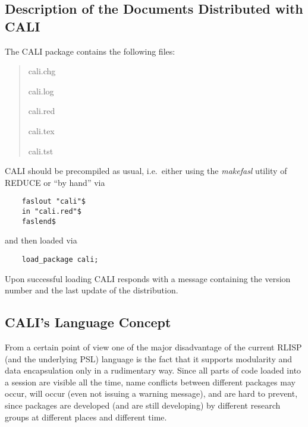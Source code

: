 \subsection{Description of the Documents Distributed with CALI}

The CALI package contains the following files:
\begin{quote}
cali.chg


cali.log


cali.red


cali.tex


cali.tst


\end{quote}

CALI should be precompiled as usual, i.e.\ either using the {\em
makefasl} utility of REDUCE or ``by hand'' via
\begin{verbatim}
    faslout "cali"$
    in "cali.red"$
    faslend$
\end{verbatim}
and then loaded via
\begin{verbatim}
    load_package cali;
\end{verbatim}
Upon successful loading CALI responds with a message containing the
version number and the last update of the distribution. 

\begin{center}
\end{center}

\subsection{CALI's Language Concept}

From a certain point of view one of the major disadvantage of the
current RLISP (and the underlying PSL) language is the fact
that it supports modularity and data encapsulation only in a
rudimentary way.  Since all parts of code loaded into a session are
visible all the time, name conflicts between different packages may
occur, will occur (even not issuing a warning message), and are hard
to prevent, since packages are developed (and are still developing)
by different research groups at different places and different time.

